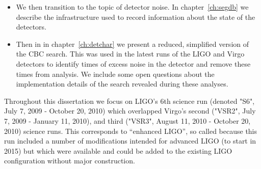 \begin{itemize}
\item We then transition to the topic of detector noise.  In
chapter~\ref{ch:segdb} we describe the infrastructure used to record 
information about the state of the detectors.

\item Then in in chapter~\ref{ch:detchar} we present a reduced,
simplified version of the CBC search.  This was used in the latest
runs of the LIGO and Virgo detectors to identify times of excess noise
in the detector and remove these times from analysis.  We include some
open questions about the implementation details of the search revealed
during these analyses.

\end{itemize}

Throughout this dissertation we focus on LIGO's 6th science run
(denoted "S6", July 7, 2009 - October 20, 2010) which overlapped
Virgo's second ("VSR2", July 7, 2009 - January 11, 2010), and third
("VSR3", August 11, 2010 - October 20, 2010) science runs.  This
corresponds to ``enhanced LIGO'', so called because this run included
a number of modifications intended for advanced LIGO (to start in
2015) but which were available and could be added to the existing
LIGO configuration without major construction.

